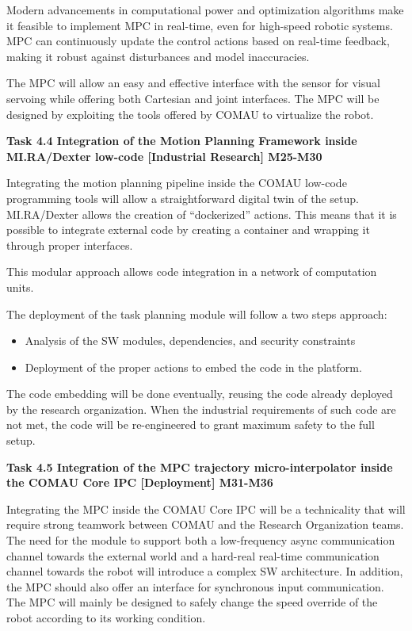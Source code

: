 \begin{longtable}[]
{\begin{minipage}[t]{\linewidth}
Modern advancements in computational power and optimization algorithms
make it feasible to implement MPC in real-time, even for high-speed
robotic systems. MPC can continuously update the control actions based
on real-time feedback, making it robust against disturbances and model
inaccuracies.

The MPC will allow an easy and effective interface with the sensor for
visual servoing while offering both Cartesian and joint interfaces. The
MPC will be designed by exploiting the tools offered by COMAU to
virtualize the robot.

\textbf{Task 4.4 Integration of the Motion Planning Framework inside
MI.RA/Dexter low-code {[}Industrial Research{]} M25-M30}

Integrating the motion planning pipeline inside the COMAU low-code
programming tools will allow a straightforward digital twin of the
setup. MI.RA/Dexter allows the creation of ``dockerized'' actions. This
means that it is possible to integrate external code by creating a
container and wrapping it through proper interfaces.

This modular approach allows code integration in a network of
computation units.

The deployment of the task planning module will follow a two steps
approach:

\begin{itemize}
\item
  Analysis of the SW modules, dependencies, and security constraints
\item
  Deployment of the proper actions to embed the code in the platform.
\end{itemize}

The code embedding will be done eventually, reusing the code already
deployed by the research organization. When the industrial requirements
of such code are not met, the code will be re-engineered to grant
maximum safety to the full setup.

\textbf{Task 4.5 Integration of the MPC trajectory micro-interpolator
inside the COMAU Core IPC {[}Deployment{]} M31-M36}

Integrating the MPC inside the COMAU Core IPC will be a technicality
that will require strong teamwork between COMAU and the Research
Organization teams. The need for the module to support both a
low-frequency async communication channel towards the external world and
a hard-real real-time communication channel towards the robot will
introduce a complex SW architecture. In addition, the MPC should also
offer an interface for synchronous input communication. The MPC will
mainly be designed to safely change the speed override of the robot
according to its working condition.


\end{minipage}}
\end{longtable}
